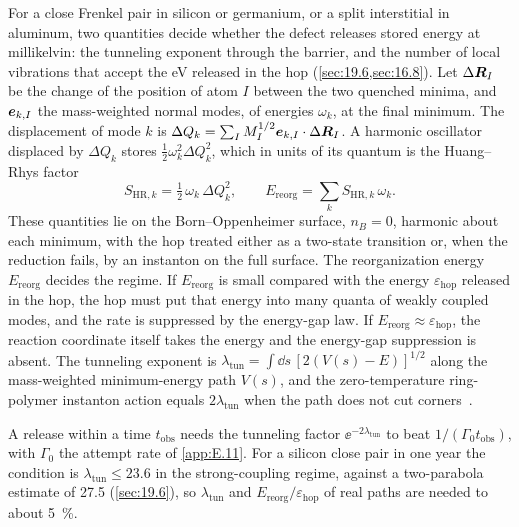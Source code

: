 For a close Frenkel pair in silicon or germanium, or a split interstitial in aluminum, two quantities decide whether the defect releases stored energy at millikelvin: the tunneling exponent through the barrier, and the number of local vibrations that accept the eV released in the hop (\cref{sec:19.6,sec:16.8}). Let $\Delta\bm{R}_I$ be the change of the position of atom $I$ between the two quenched minima, and $\bm{e}_{k,I}$ the mass-weighted normal modes, of energies $\omega_k$, at the final minimum. The displacement of mode $k$ is $\Delta Q_k = \sum_I M_I^{1/2}\bm{e}_{k,I}\cdot\Delta\bm{R}_I$. A harmonic oscillator displaced by $\Delta Q_k$ stores $\tfrac12\omega_k^2\Delta Q_k^2$, which in units of its quantum is the Huang--Rhys factor~\cite{huang1950theory}
\begin{equation}
  S_{\mathrm{HR},k} = \tfrac12\,\omega_k\,\Delta Q_k^2 ,
  \qquad E_{\mathrm{reorg}} = \sum_k S_{\mathrm{HR},k}\,\omega_k .
  \label{eq:E.22-SHR}
\end{equation}
These quantities lie on the Born--Oppenheimer surface, $n_B = 0$, harmonic about each minimum, with the hop treated either as a two-state transition or, when the reduction fails, by an instanton on the full surface. The reorganization energy $E_{\mathrm{reorg}}$ decides the regime. If $E_{\mathrm{reorg}}$ is small compared with the energy $\varepsilon_{\mathrm{hop}}$ released in the hop, the hop must put that energy into many quanta of weakly coupled modes, and the rate is suppressed by the energy-gap law. If $E_{\mathrm{reorg}} \approx \varepsilon_{\mathrm{hop}}$, the reaction coordinate itself takes the energy and the energy-gap suppression is absent. The tunneling exponent is $\lambda_{\mathrm{tun}} = \int\dd s\,[2(V(s) - E)]^{1/2}$ along the mass-weighted minimum-energy path $V(s)$, and the zero-temperature ring-polymer instanton action equals $2\lambda_{\mathrm{tun}}$ when the path does not cut corners~\cite{lawrence2024semiclassical}.

A release within a time $t_{\mathrm{obs}}$ needs the tunneling factor $\ee^{-2\lambda_{\mathrm{tun}}}$ to beat $1/(\varGamma_0t_{\mathrm{obs}})$, with $\varGamma_0$ the attempt rate of \cref{app:E.11}. For a silicon close pair in one year the condition is $\lambda_{\mathrm{tun}} \le 23.6$ in the strong-coupling regime, against a two-parabola estimate of 27.5 (\cref{sec:19.6}), so $\lambda_{\mathrm{tun}}$ and $E_{\mathrm{reorg}}/\varepsilon_{\mathrm{hop}}$ of real paths are needed to about \SI{5}{\percent}.

